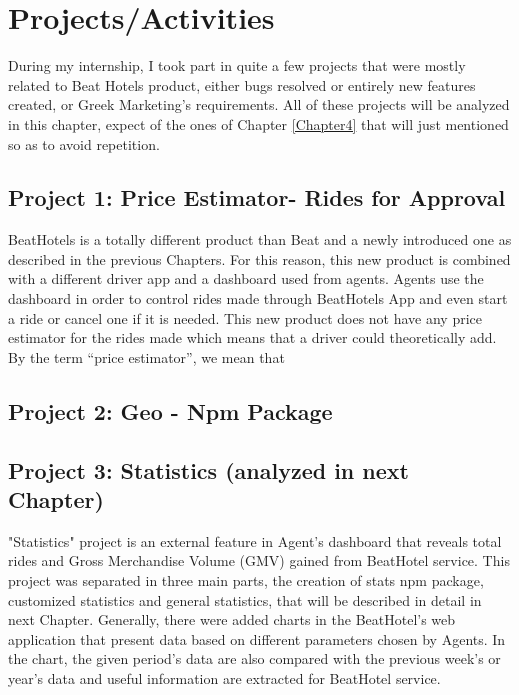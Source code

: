 
\chapter{Projects/Activities} %

\label{Chapter3}

During my internship, I took part in quite a few projects that were mostly related to Beat Hotels product, either bugs resolved or entirely new features created, or Greek Marketing’s requirements. All of these projects will be analyzed in this chapter, expect of the ones of Chapter \ref{Chapter4} that will just mentioned so as to avoid repetition.

\section{Project 1: Price Estimator- Rides for Approval}

BeatHotels is a totally different product than Beat and a newly introduced one as described in the previous Chapters. For this reason, this new product is combined with a different driver app and a dashboard used from agents. Agents use the dashboard in order to control rides made through BeatHotels App and even start a ride or cancel one if it is needed. This new product does not have any price estimator for the rides made which means that a driver could theoretically add. By the term “price estimator”, we mean that 

\section{Project 2: Geo - Npm Package}


\section{Project 3: Statistics (analyzed in next Chapter)}

"Statistics" project is an external feature in Agent's dashboard that reveals total rides and Gross Merchandise Volume (GMV) gained from BeatHotel service. This project was separated in three main parts, the creation of stats npm package, customized statistics and general statistics, that will be described in detail in next Chapter. Generally, there were added charts in the BeatHotel's web application that present data based on different parameters chosen by Agents. In the chart, the given period's data are also compared with the previous week's or year's data and useful information are extracted for BeatHotel service.

